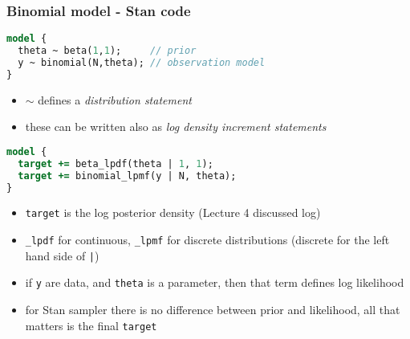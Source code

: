 \documentclass[finnish,english,t]{beamer}
\begin{document}
\begin{frame}[fragile]
  \frametitle{Binomial model - Stan code}
  
  {\small
\begin{lstlisting}[language=Stan]
model {
  theta ~ beta(1,1);     // prior
  y ~ binomial(N,theta); // observation model
}
\end{lstlisting}}

    \vspace{-0.5\baselineskip}
    \begin{itemize}
    \item $\sim$ defines a \textit{distribution statement}
    \item these can be written also as \textit{log density increment statements}
    \end{itemize}

  {\small
\begin{lstlisting}[language=Stan]
model {
  target += beta_lpdf(theta | 1, 1);
  target += binomial_lpmf(y | N, theta);
}
\end{lstlisting}}

    \vspace{-0.5\baselineskip}
    \begin{itemize}
    \item<2-> {\tt target} is the log posterior density (Lecture 4 discussed log)
    \item<3-> {\tt \_lpdf} for continuous, {\tt \_lpmf} for discrete distributions (discrete for the left hand side of {\tt |})
    \item<4-> if \texttt{y} are data, and \texttt{theta} is a parameter, then that term defines log likelihood
    \item<5-> for Stan sampler there is no difference between prior and likelihood, all that matters is the final {\tt target}
    \end{itemize}

\end{frame} 


  

\end{document}
